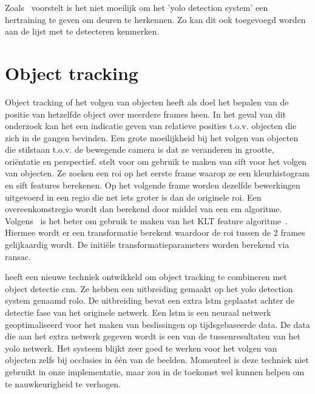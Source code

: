             Zoals~\cite{Llopart2017} voorstelt is het niet moeilijk om het '\gls{yolo} detection system' een hertraining te geven om deuren te herkennen. Zo kan dit ook toegevoegd worden aan de lijst met te detecteren kenmerken. 


    \section{Object tracking} \label{sec:obj_tracking}
        Object tracking of het volgen van objecten heeft als doel het bepalen van de positie van hetzelfde object over meerdere frames heen. In het geval van dit onderzoek kan het een indicatie geven van relatieve posities t.o.v. objecten die zich in de gangen bevinden.
        Een grote moeilijkheid bij het volgen van objecten die stilstaan t.o.v. de bewegende camera is dat ze veranderen in grootte, ori\"{e}ntatie en perspectief.
        \cite{Zhou2009} stelt voor om gebruik te maken van \gls{sift} voor het volgen van objecten. Ze zoeken een \gls{roi} op het eerste frame waarop ze een kleurhistogram en \gls{sift} features berekenen.
        Op het volgende frame worden dezelfde bewerkingen uitgevoerd in een regio die net iets groter is dan de originele \gls{roi}. Een overeenkomstregio wordt dan berekend door middel van een \gls{em} algoritme.
        Volgens~\cite{Baheti2016} is het beter om gebruik te maken van het KLT feature algoritme~\cite{tomasi1991detection}. Hiermee wordt er een transformatie berekent waardoor de \gls{roi} tussen de 2 frames gelijkaardig wordt. De initi\"{e}le transformatieparameters worden berekend via \gls{ransac}.

        \cite{Ning2017} heeft een nieuwe techniek ontwikkeld om object tracking te combineren met object detectie \gls{cnn}. Ze hebben een uitbreiding gemaakt op het \gls{yolo} detection system genaamd \gls{rolo}.
        De uitbreiding bevat een extra \gls{lstm} geplaatst achter de detectie fase van het originele netwerk. Een \gls{lstm} is een neuraal netwerk geoptimaliseerd voor het maken van beslissingen op tijdsgebaseerde data.
        De data die aan het extra netwerk gegeven wordt is een van de tussenresultaten van het \gls{yolo} netwerk.
        Het systeem blijkt zeer goed te werken voor het volgen van objecten zelfs bij occlusies in \'{e}\'{e}n van de beelden.
        Momenteel is deze techniek niet gebruikt in onze implementatie, maar zou in de toekomst wel kunnen helpen om te nauwkeurigheid te verhogen.


